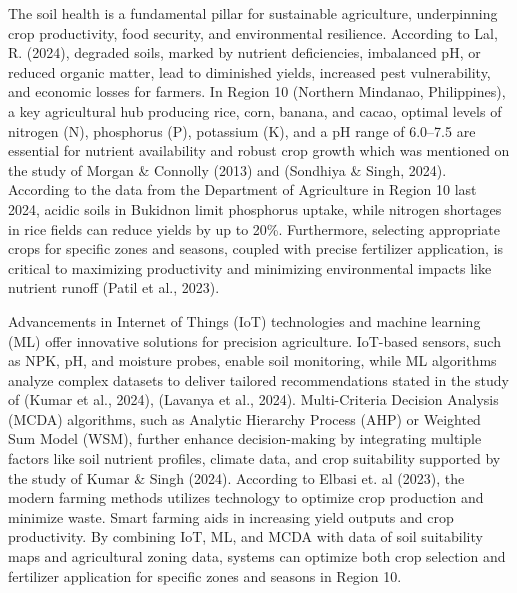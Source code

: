 \begin{doublespace}
The soil health is a fundamental pillar for sustainable agriculture, underpinning crop productivity, food security, and environmental resilience. According to Lal, R. (2024), degraded soils, marked by nutrient deficiencies, imbalanced pH, or reduced organic matter, lead to diminished yields, increased pest vulnerability, and economic losses for farmers. In Region 10 (Northern Mindanao, Philippines), a key agricultural hub producing rice, corn, banana, and cacao, optimal levels of nitrogen (N), phosphorus (P), potassium (K), and a pH range of 6.0–7.5 are essential for nutrient availability and robust crop growth which was mentioned on the study of Morgan \& Connolly (2013) and (Sondhiya \& Singh, 2024). According to the data from the Department of Agriculture in Region 10 last 2024, acidic soils in Bukidnon limit phosphorus uptake, while nitrogen shortages in rice fields can reduce yields by up to 20\%. Furthermore, selecting appropriate crops for specific zones and seasons, coupled with precise fertilizer application, is critical to maximizing productivity and minimizing environmental impacts like nutrient runoff (Patil et al., 2023).

Advancements in Internet of Things (IoT) technologies and machine learning (ML) offer innovative solutions for precision agriculture. IoT-based sensors, such as NPK, pH, and moisture probes, enable  soil monitoring, while ML algorithms analyze complex datasets to deliver tailored recommendations stated in the study of (Kumar et al., 2024), (Lavanya et al., 2024). Multi-Criteria Decision Analysis (MCDA) algorithms, such as Analytic Hierarchy Process (AHP) or Weighted Sum Model (WSM), further enhance decision-making by integrating multiple factors like soil nutrient profiles, climate data, and crop suitability supported by the study of Kumar \& Singh (2024). According to Elbasi et. al (2023), the modern farming methods utilizes technology to optimize crop production and minimize waste. Smart farming aids in increasing yield outputs and crop productivity. By combining IoT, ML, and MCDA with data of soil suitability maps and agricultural zoning data, systems can optimize both crop selection and fertilizer application for specific zones and seasons in Region 10.


\end{doublespace}
